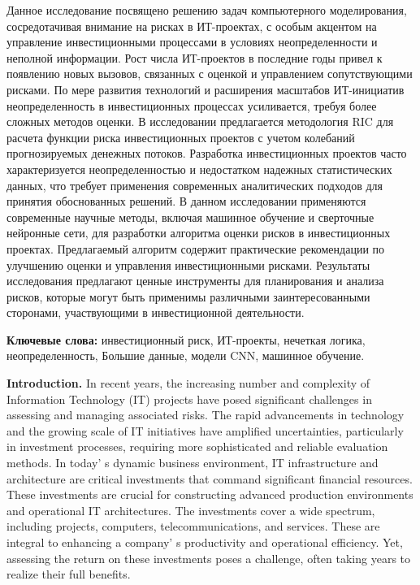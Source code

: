 {Данное исследование посвящено решению задач компьютерного моделирования,
сосредотачивая внимание на рисках в ИТ-проектах, с особым акцентом на
управление инвестиционными процессами в условиях неопределенности и
неполной информации. Рост числа ИТ-проектов в последние годы привел к
появлению новых вызовов, связанных с оценкой и управлением
сопутствующими рисками. По мере развития технологий и расширения
масштабов ИТ-инициатив неопределенность в инвестиционных процессах
усиливается, требуя более сложных методов оценки. В исследовании
предлагается методология RIC для расчета функции риска инвестиционных
проектов с учетом колебаний прогнозируемых денежных потоков. Разработка
инвестиционных проектов часто характеризуется неопределенностью и
недостатком надежных статистических данных, что требует применения
современных аналитических подходов для принятия обоснованных решений. В
данном исследовании применяются современные научные методы, включая
машинное обучение и сверточные нейронные сети, для разработки алгоритма
оценки рисков в инвестиционных проектах. Предлагаемый алгоритм содержит
практические рекомендации по улучшению оценки и управления
инвестиционными рисками. Результаты исследования предлагают ценные
инструменты для планирования и анализа рисков, которые могут быть
применимы различными заинтересованными сторонами, участвующими в
инвестиционной деятельности.

{\bfseries Ключевые слова:} инвестиционный риск, ИТ-проекты, нечеткая
логика, неопределенность, Большие данные, модели CNN, машинное обучение.

{\bfseries Introduction.} In recent years, the increasing number and
complexity of Information Technology (IT) projects have posed
significant challenges in assessing and managing associated risks. The
rapid advancements in technology and the growing scale of IT initiatives
have amplified uncertainties, particularly in investment processes,
requiring more sophisticated and reliable evaluation methods. In
today' s dynamic business environment, IT infrastructure
and architecture are critical investments that command significant
financial resources. These investments are crucial for constructing
advanced production environments and operational IT architectures. The
investments cover a wide spectrum, including projects, computers,
telecommunications, and services. These are integral to enhancing a
company' s productivity and operational efficiency. Yet,
assessing the return on these investments poses a challenge, often
taking years to realize their full benefits.

}
